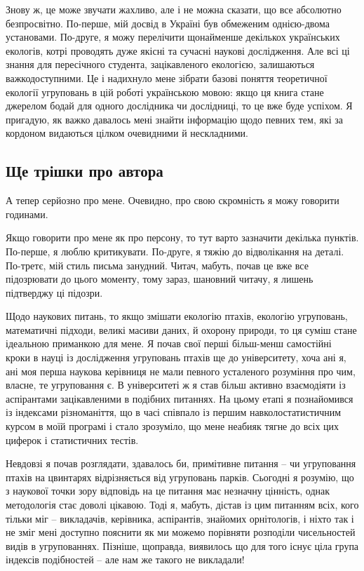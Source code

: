 \documentclass[
  11pt,
]{book}
\begin{document}
Знову ж, це може звучати жахливо, але і не можна сказати, що все абсолютно безпросвітно. По-перше, мій досвід в Україні був обмеженим однією-двома установами. По-друге, я можу перелічити щонайменше декількох українських екологів, котрі проводять дуже якісні та сучасні наукові дослідження. Але всі ці знання для пересічного студента, зацікавленого екологією, залишаються важкодоступними. Це і надихнуло мене зібрати базові поняття теоретичної екології угруповань в цій роботі українською мовою: якщо ця книга стане джерелом бодай для одного дослідника чи дослідниці, то це вже буде успіхом. Я пригадую, як важко давалось мені знайти інформацію щодо певних тем, які за кордоном видаються цілком очевидними й нескладними.

\subsection{Ще трішки про автора}\label{more-about-author}

А тепер серйозно про мене. Очевидно, про свою скромність я можу говорити годинами.

Якщо говорити про мене як про персону, то тут варто зазначити декілька пунктів. По-перше, я люблю критикувати. По-друге, я тяжію до відволікання на деталі. По-третє, мій стиль письма занудний. Читач, мабуть, почав це вже все підозрювати до цього моменту, тому зараз, шановний читачу, я лишень підтверджу ці підозри.

Щодо наукових питань, то якщо змішати екологію птахів, екологію угруповань, математичні підходи, великі масиви даних, й охорону природи, то ця суміш стане ідеальною приманкою для мене. Я почав свої перші більш-менш самостійні кроки в науці із дослідження угруповань птахів ще до університету, хоча ані я, ані моя перша наукова керівниця не мали певного усталеного розуміння про чим, власне, те угруповання є. В університеті ж я став більш активно взаємодіяти із аспірантами зацікавленими в подібних питаннях. На цьому етапі я познайомився із індексами різноманіття, що в часі співпало із першим навколостатистичним курсом в моїй програмі і стало зрозуміло, що мене неабияк тягне до всіх цих циферок і статистичних тестів.

Невдовзі я почав розглядати, здавалось би, примітивне питання -- чи угруповання птахів на цвинтарях відрізняється від угруповань парків. Сьогодні я розумію, що з наукової точки зору відповідь на це питання має незначну цінність, однак методологія стає доволі цікавою. Тоді я, мабуть, дістав із цим питанням всіх, кого тільки міг -- викладачів, керівника, аспірантів, знайомих орнітологів, і ніхто так і не зміг мені доступно пояснити як ми можемо порівняти розподіли чисельностей видів в угрупованнях. Пізніше, щоправда, виявилось що для того існує ціла група індексів подібностей -- але нам же такого не викладали!
\end{document}
